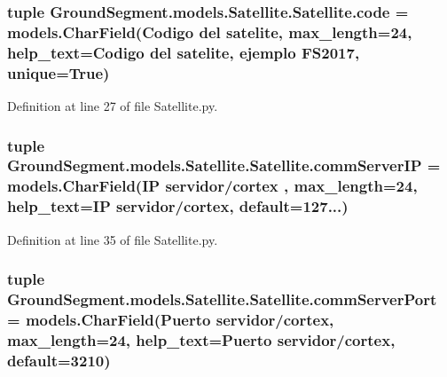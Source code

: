 \subsubsection[{code}]{\setlength{\rightskip}{0pt plus 5cm}tuple Ground\+Segment.\+models.\+Satellite.\+Satellite.\+code = models.\+Char\+Field(\textquotesingle{}Codigo del satelite\textquotesingle{}, max\+\_\+length=24, help\+\_\+text=\textquotesingle{}Codigo del satelite, ejemplo F\+S2017\textquotesingle{}, unique=True)\hspace{0.3cm}{\ttfamily [static]}}\label{class_ground_segment_1_1models_1_1_satellite_1_1_satellite_ae4a43a1ee941bff4914f4fed1e2775a1}


Definition at line 27 of file Satellite.\+py.

\hypertarget{class_ground_segment_1_1models_1_1_satellite_1_1_satellite_a17c5c47d8ef48fe204723f224800a4cc}{}
\subsubsection[{comm\+Server\+I\+P}]{\setlength{\rightskip}{0pt plus 5cm}tuple Ground\+Segment.\+models.\+Satellite.\+Satellite.\+comm\+Server\+I\+P = models.\+Char\+Field(\textquotesingle{}I\+P servidor/cortex \textquotesingle{}, max\+\_\+length=24, help\+\_\+text=\textquotesingle{}I\+P servidor/cortex\textquotesingle{}, default=\textquotesingle{}127...\textquotesingle{})\hspace{0.3cm}{\ttfamily [static]}}\label{class_ground_segment_1_1models_1_1_satellite_1_1_satellite_a17c5c47d8ef48fe204723f224800a4cc}


Definition at line 35 of file Satellite.\+py.

\hypertarget{class_ground_segment_1_1models_1_1_satellite_1_1_satellite_a3dce35fcdd0293a4c147483ec91abcb3}{}
\subsubsection[{comm\+Server\+Port}]{\setlength{\rightskip}{0pt plus 5cm}tuple Ground\+Segment.\+models.\+Satellite.\+Satellite.\+comm\+Server\+Port = models.\+Char\+Field(\textquotesingle{}Puerto servidor/cortex\textquotesingle{}, max\+\_\+length=24, help\+\_\+text=\textquotesingle{}Puerto servidor/cortex\textquotesingle{}, default=\textquotesingle{}3210\textquotesingle{})\hspace{0.3cm}{\ttfamily [static]}}\label{class_ground_segment_1_1models_1_1_satellite_1_1_satellite_a3dce35fcdd0293a4c147483ec91abcb3}


